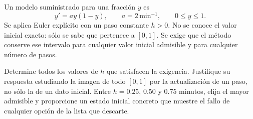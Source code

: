Un modelo suministrado para una fracción \(y\) es
\[
y'=a y(1-y),\qquad a=2\,\mathrm{min}^{-1},\qquad 0\le y\le1.
\]
Se aplica Euler explícito con un paso constante \(h>0\). No se conoce el valor inicial exacto: sólo se sabe que pertenece a \([0,1]\). Se exige que el método conserve ese intervalo para cualquier valor inicial admisible y para cualquier número de pasos.

Determine todos los valores de \(h\) que satisfacen la exigencia. Justifique su respuesta estudiando la imagen de todo \([0,1]\) por la actualización de un paso, no sólo la de un dato inicial. Entre \(h=0.25\), \(0.50\) y \(0.75\) minutos, elija el mayor admisible y proporcione un estado inicial concreto que muestre el fallo de cualquier opción de la lista que descarte.
